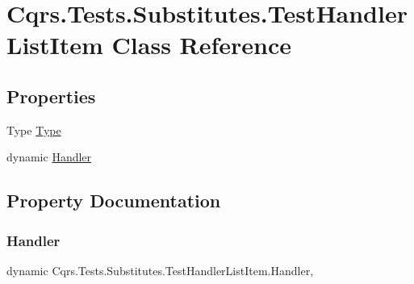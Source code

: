 \hypertarget{classCqrs_1_1Tests_1_1Substitutes_1_1TestHandlerListItem}{}\section{Cqrs.\+Tests.\+Substitutes.\+Test\+Handler\+List\+Item Class Reference}
\label{classCqrs_1_1Tests_1_1Substitutes_1_1TestHandlerListItem}
\subsection*{Properties}
\begin{DoxyCompactItemize}
\item 
Type \hyperlink{classCqrs_1_1Tests_1_1Substitutes_1_1TestHandlerListItem_af8f72acf02646f0170029dfbad2b21bd_af8f72acf02646f0170029dfbad2b21bd}{Type}
\item 
dynamic \hyperlink{classCqrs_1_1Tests_1_1Substitutes_1_1TestHandlerListItem_ae8a00c569529c6d7e1c245444d8dcc31_ae8a00c569529c6d7e1c245444d8dcc31}{Handler}
\end{DoxyCompactItemize}


\subsection{Property Documentation}
\mbox{\label{classCqrs_1_1Tests_1_1Substitutes_1_1TestHandlerListItem_ae8a00c569529c6d7e1c245444d8dcc31_ae8a00c569529c6d7e1c245444d8dcc31}} 
\subsubsection{\texorpdfstring{Handler}{Handler}}
{\footnotesize\ttfamily dynamic Cqrs.\+Tests.\+Substitutes.\+Test\+Handler\+List\+Item.\+Handler\hspace{0.3cm}{\ttfamily [get]}, {\ttfamily [set]}}

